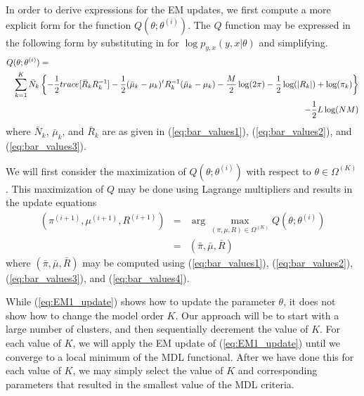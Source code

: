 \documentclass[12pt]{article}
\begin{document}
In order to derive expressions for the EM updates,
we first compute a more explicit form 
for the function $Q(\theta; \theta^{(i)})$.
The $Q$ function may be expressed in the following
form by substituting in for $\log p_{y,x}(y,x|\theta)$ and simplifying.
\begin{eqnarray*}
\lefteqn{ Q(\theta;\theta^{(i)}) = } \\
& & \sum_{k=1}^K \bar{N}_k \left\{
-\frac{1}{2} trace[\bar{R}_k R_k^{-1} ]
-\frac{1}{2} (\bar{\mu}_k -\mu_k)^t R_k^{-1}(\bar{\mu}_k -\mu_k)
-\frac{M}{2} \log(2\pi) 
-\frac{1}{2} \log(|R_k|) 
+\log(\pi_k) \right\} \\
& & - \frac{1}{2} L \log (NM)
\end{eqnarray*}
where $\bar{N}_k$, $\bar{\mu}_k$, and $\bar{R}_k$ are as 
given in (\ref{eq:bar_values1}), (\ref{eq:bar_values2}), and (\ref{eq:bar_values3}).

We will first consider the maximization of $Q(\theta; \theta^{(i)})$
with respect to $\theta\in \Omega^{(K)}$.
This maximization of $Q$ may be done using Lagrange multipliers
and results in the update equations
\begin{eqnarray}
\nonumber
(\pi^{(i+1)},\mu^{(i+1)},R^{(i+1)}) 
&=&  \arg \max_{ (\pi,\mu,R)\in \Omega^{(K)} }
Q(\theta;\theta^{(i)}) \\
&=& (\bar{\pi},\bar{\mu},\bar{R}) 
\label{eq:EM1_update}
\end{eqnarray}
where $(\bar{\pi},\bar{\mu},\bar{R})$ may be computed using 
(\ref{eq:bar_values1}), (\ref{eq:bar_values2}), (\ref{eq:bar_values3}), and (\ref{eq:bar_values4}).

While (\ref{eq:EM1_update}) shows how to update the parameter $\theta$,
it does not show how to change the model order $K$.
Our approach will be to start with a large number of clusters,
and then sequentially decrement the value of $K$.
For each value of $K$, we will apply the EM update of (\ref{eq:EM1_update})
until we converge to a local minimum of the MDL functional.
After we have done this for each value of $K$, we may simply
select the value of $K$ and corresponding parameters
that resulted in the smallest value of the MDL criteria.
\end{document}

